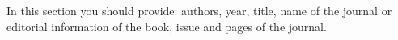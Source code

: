 \printbibliography
{}

In this section you should provide: authors, year, title, name of the journal or editorial information of the book, issue and pages of the journal. 